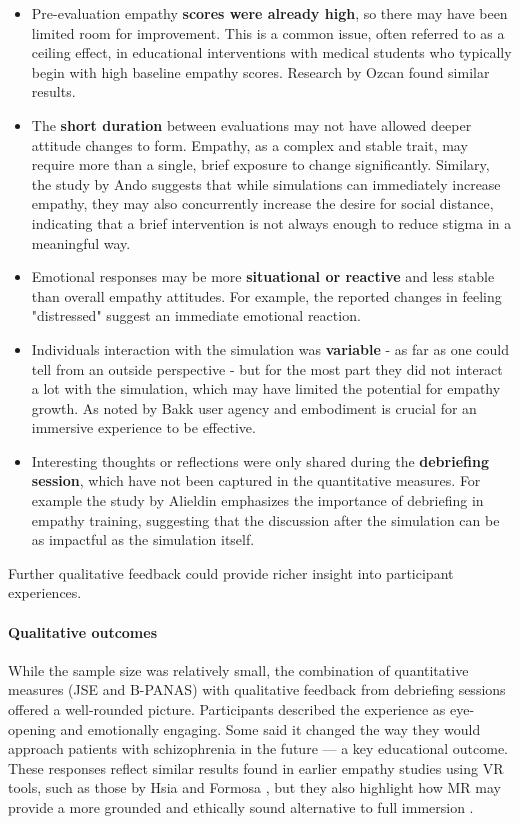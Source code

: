 \begin{itemize}
  \item Pre-evaluation empathy \textbf{scores were already high}, so there may have been limited room for improvement. This is a common issue, often referred to as a ceiling effect, in educational interventions with medical students who typically begin with high baseline empathy scores. Research by Ozcan \cite{Ozcan2018} found similar results.
  \item The \textbf{short duration} between evaluations may not have allowed deeper attitude changes to form. Empathy, as a complex and stable trait, may require more than a single, brief exposure to change significantly. Similary, the study by Ando \cite{Ando2011} suggests that while simulations can immediately increase empathy, they may also concurrently increase the desire for social distance, indicating that a brief intervention is not always enough to reduce stigma in a meaningful way.
  \item Emotional responses may be more \textbf{situational or reactive} and less stable than overall empathy attitudes. For example, the reported changes in feeling "distressed" suggest an immediate emotional reaction.
  \item Individuals interaction with the simulation was \textbf{variable} - as far as one could tell from an outside perspective - but for the most part they did not interact a lot with the simulation, which may have limited the potential for empathy growth. As noted by Bakk \cite{Bakk2023} user agency and embodiment is crucial for an immersive experience to be effective. 
  \item Interesting thoughts or reflections were only shared during the \textbf{debriefing session}, which have not been captured in the quantitative measures. For example the study by Alieldin \cite{Alieldin2024} emphasizes the importance of debriefing in empathy training, suggesting that the discussion after the simulation can be as impactful as the simulation itself.
\end{itemize}

Further qualitative feedback could provide richer insight into participant experiences.

\paragraph{Qualitative outcomes}
While the sample size was relatively small, the combination of quantitative measures (JSE and B-PANAS) with qualitative feedback from debriefing sessions offered a well-rounded picture. Participants described the experience as eye-opening and emotionally engaging. Some said it changed the way they would approach patients with schizophrenia in the future — a key educational outcome. These responses reflect similar results found in earlier empathy studies using VR tools, such as those by Hsia \cite{Hsia2022} and Formosa \cite{Formosa2018}, but they also highlight how MR may provide a more grounded and ethically sound alternative to full immersion \cite{Krogmeier2024}.

